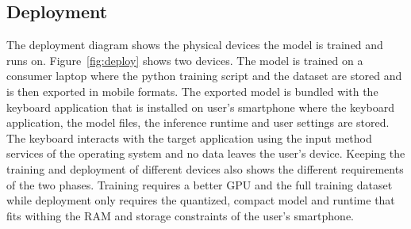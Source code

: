 \documentclass[12pt,a4paper]{report}
\begin{document}
\subsection{Deployment}
The deployment diagram shows the physical devices the model is trained and runs on. Figure~\ref{fig:deploy} shows two devices. The model is trained on a consumer laptop where the python training script and the dataset are stored and is then exported in mobile formats. The exported model is bundled with the keyboard application that is installed on user's smartphone where the keyboard application, the model files, the inference runtime and user settings are stored. The keyboard interacts with the target application using the input method services of the operating system and no data leaves the user's device. Keeping the training and deployment of different devices also shows the different requirements of the two phases. Training requires a better GPU and the full training dataset while deployment only requires the quantized, compact model and runtime that fits withing the RAM and storage constraints of the user's smartphone.
\end{document}
